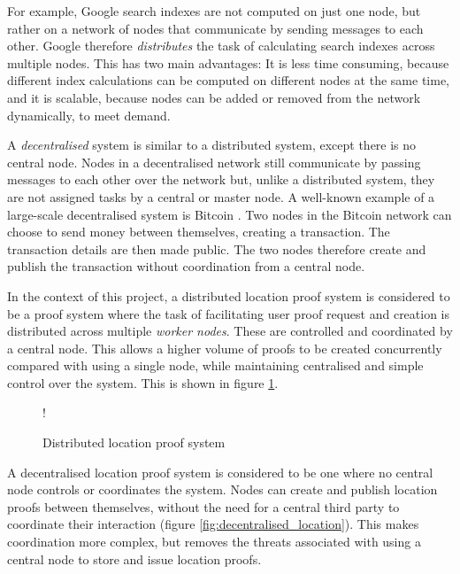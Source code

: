 For example, Google search indexes are not computed on just one node, but rather on a network of nodes that communicate by sending messages to each other. Google therefore \textit{distributes} the task of calculating search indexes across multiple nodes. This has two main advantages: It is less time consuming, because different index calculations can be computed on different nodes at the same time, and it is scalable, because nodes can be added or removed from the network dynamically, to meet demand.

A \textit{decentralised} system is similar to a distributed system, except there is no central node. Nodes in a decentralised network still communicate by passing messages to each other over the network but, unlike a distributed system, they are not assigned tasks by a central or master node. A well-known example of a large-scale decentralised system is Bitcoin \cite{bitcoin}. Two nodes in the Bitcoin network can choose to send money between themselves, creating a transaction. The transaction details are then made public. The two nodes therefore create and publish the transaction without coordination from a central node.

In the context of this project, a distributed location proof system is considered to be a proof system where the task of facilitating user proof request and creation is distributed across multiple \textit{worker nodes}. These are controlled and coordinated by a central node. This allows a higher volume of proofs to be created concurrently compared with using a single node, while maintaining centralised and simple control over the system. This is shown in figure \ref{fig:distributed_location}.

\begin{figure}[H]
\begin{center}
 {!} {}
\end{center}
\caption{Distributed location proof system}
\label{fig:distributed_location}
\end{figure}

A decentralised location proof system is considered to be one where no central node controls or coordinates the system. Nodes can create and publish location proofs between themselves, without the need for a central third party to coordinate their interaction (figure \ref{fig:decentralised_location}). This makes coordination more complex, but removes the threats associated with using a central node to store and issue location proofs.

